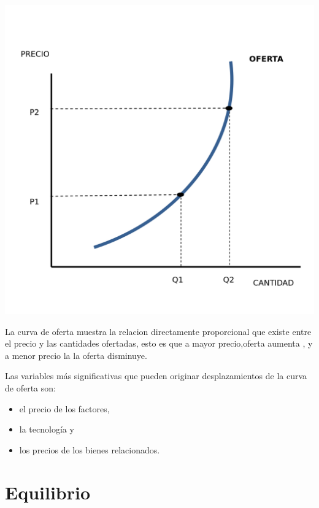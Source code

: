 \documentclass[12pt]{book}
\begin{document}
\begin {center}
\includegraphics[scale=.2]{1200px-Curva_de_oferta.png}
\\
\begin{tiny}
La curva de oferta muestra la relacion directamente proporcional que existe entre el precio y las cantidades ofertadas, esto es que a mayor precio,oferta aumenta , y a menor precio la la oferta disminuye.

\end{tiny}\end{center}


Las variables más significativas que pueden originar desplazamientos de la curva de oferta son:

\begin{itemize}
\item el precio de los factores,
\item la tecnología y
\item los precios de los bienes relacionados.
\end{itemize}


\section{Equilibrio}
\end{document}
